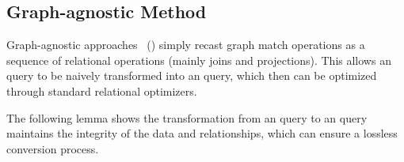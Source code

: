 \subsection{Graph-agnostic Method}
\label{sec:intuitive-method}
Graph-agnostic approaches~\cite{apache-age,DuckPGQ,DuckPGQ-VLDB} () simply recast graph match operations
as a sequence of relational operations (mainly joins and projections). This allows an \spjm query to be naively transformed into an \spj query, which then can be optimized through standard relational optimizers.

The following lemma shows the transformation from an \spjm query to an \spj query maintains the integrity of the data and relationships,
which can ensure a lossless conversion process.

